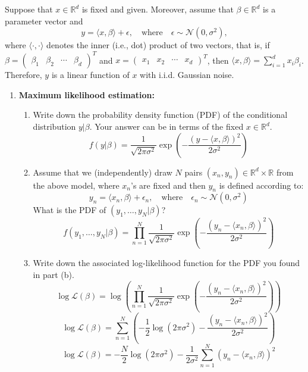 \documentclass[a3paper,12pt]{extarticle} %
\begin{document}
Suppose that \( x \in \mathbb{R}^d \) is fixed and given. Moreover, assume that \( \beta \in \mathbb{R}^d \) is a parameter vector and
\[
y = \langle x, \beta \rangle + \epsilon, \quad \text{where} \quad \epsilon \sim \mathcal{N}(0, \sigma^2),
\]
where \( \langle \cdot, \cdot \rangle \) denotes the inner (i.e., dot) product of two vectors, that is, if \( \beta = \begin{pmatrix} \beta_1 & \beta_2 & \cdots & \beta_d \end{pmatrix}^T \) and
\( x = \begin{pmatrix} x_1 & x_2 & \cdots & x_d \end{pmatrix}^T \), then \( \langle x, \beta \rangle = \sum_{i=1}^d x_i \beta_i \).
Therefore, \( y \) is a linear function of \( x \) with i.i.d. Gaussian noise.

\begin{enumerate}
    \item \textbf{Maximum likelihood estimation:}
    \begin{enumerate}
        \item Write down the probability density function (PDF) of the conditional distribution \( y | \beta \). Your answer can be in terms of the fixed \( x \in \mathbb{R}^d \).
        \[
            f(y | \beta) = \frac{1}{\sqrt{2 \pi \sigma^2}} \exp \left( -\frac{(y - \langle x, \beta \rangle)^2}{2 \sigma^2} \right)
        \]

        \item Assume that we (independently) draw \( N \) pairs \( (x_n, y_n) \in \mathbb{R}^d \times \mathbb{R} \) from the above model, where \( x_n \)'s are fixed and then \( y_n \) is defined according to:
        \[
            y_n = \langle x_n, \beta \rangle + \epsilon_n, \quad \text{where} \quad \epsilon_n \sim \mathcal{N}(0, \sigma^2)
        \]
        What is the PDF of \( (y_1, \ldots, y_N | \beta) \)?
        \[
            f(y_1, \ldots, y_N | \beta) = \prod_{n=1}^N \frac{1}{\sqrt{2 \pi \sigma^2}} \exp \left( -\frac{(y_n - \langle x_n, \beta \rangle)^2}{2 \sigma^2} \right)
        \]

        \item Write down the associated log-likelihood function for the PDF you found in part (b).
        \[
            \log \mathcal{L}(\beta) = \log \left( \prod_{n=1}^N \frac{1}{\sqrt{2 \pi \sigma^2}} \exp \left( -\frac{(y_n - \langle x_n, \beta \rangle)^2}{2 \sigma^2} \right) \right)
        \]
        \[
            \log \mathcal{L}(\beta) = \sum_{n=1}^N \left( -\frac{1}{2} \log (2 \pi \sigma^2) - \frac{(y_n - \langle x_n, \beta \rangle)^2}{2 \sigma^2} \right)
        \]
        \[
            \log \mathcal{L}(\beta) = -\frac{N}{2} \log (2 \pi \sigma^2) - \frac{1}{2 \sigma^2} \sum_{n=1}^N (y_n - \langle x_n, \beta \rangle)^2
        \]


\end{enumerate}
\end{enumerate}
\end{document}
